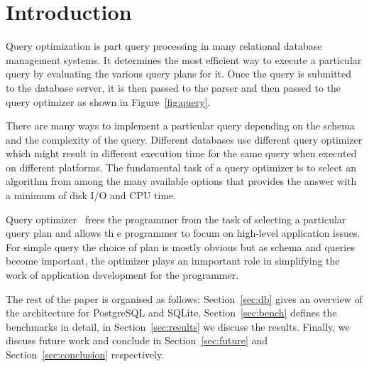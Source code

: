 
\section{Introduction}
\label{sec:intro}


Query optimization is part query processing in many relational database management systems. It determines the most efficient way to execute a particular query by evaluating the various query plans for it. Once the query is submitted to the database server, it is then passed to the parser and then passed to the query optimizer as shown in Figure~\ref{fig:query}.

There are many ways to implement a particular query depending on the schema and the complexity of the query. Different databases use different query optimizer which might result in different execution time for the same query when executed on different platforms. The fundamental task of a query optimizer is to select an algorithm from among the many available options that provides the answer with a minimum of disk I/O and CPU time.

Query optimizer~\cite{ref:sqlite3} frees the programmer from the task of selecting a particular query plan and allows th e programmer to focum on high-level application issues. For simple query the choice of plan is mostly obvious but as schema and queries become important, the optimizer plays an inmportant role in simplifying the work of application development for the programmer.

The rest of the paper is organised as follows: Section~\ref{sec:db} gives an overview of the architecture for PostgreSQL and SQLite, Section~\ref{sec:bench} defines the benchmarks in detail, in Section~\ref{sec:results} we discuss the results. Finally, we discuss future work and conclude in Section~\ref{sec:future} and Section~\ref{sec:conclusion} respectively. 


